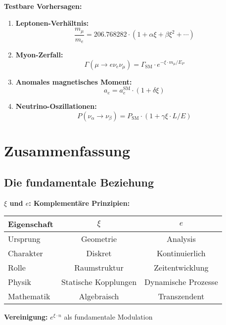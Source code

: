 \documentclass[12pt,a4paper]{article}
\begin{document}
	\begin{anwendung}
		\textbf{Testbare Vorhersagen:}
		
		\begin{enumerate}
			\item \textbf{Leptonen-Verhältnis:}
			\begin{equation}
				\frac{m_\mu}{m_e} = 206.768282 \cdot (1 + \alpha \xi + \beta \xi^2 + \cdots)
			\end{equation}
			
			\item \textbf{Myon-Zerfall:}
			\begin{equation}
				\Gamma(\mu \to e\nu_e\nu_\mu) = \Gamma_{\text{SM}} \cdot e^{-\xi \cdot m_\mu/E_P}
			\end{equation}
			
			\item \textbf{Anomales magnetisches Moment:}
			\begin{equation}
				a_e = a_e^{\text{SM}} \cdot (1 + \delta \xi)
			\end{equation}
			
			\item \textbf{Neutrino-Oszillationen:}
			\begin{equation}
				P(\nu_\alpha \to \nu_\beta) = P_{\text{SM}} \cdot (1 + \gamma \xi \cdot L/E)
			\end{equation}
		\end{enumerate}
	\end{anwendung}
	
	\section{Zusammenfassung}
	
	\subsection{Die fundamentale Beziehung}
	
	\begin{erkenntnis}
		\textbf{$\xi$ und $e$: Komplementäre Prinzipien:}
		
		\begin{center}
			\begin{tabular}{lcc}
				\toprule
				\textbf{Eigenschaft} & \textbf{$\xi$} & \textbf{$e$} \\
				\midrule
				Ursprung & Geometrie & Analysis \\
				Charakter & Diskret & Kontinuierlich \\
				Rolle & Raumstruktur & Zeitentwicklung \\
				Physik & Statische Kopplungen & Dynamische Prozesse \\
				Mathematik & Algebraisch & Transzendent \\
				\bottomrule
			\end{tabular}
		\end{center}
		
		\textbf{Vereinigung:} $e^{\xi \cdot n}$ als fundamentale Modulation
	\end{erkenntnis}
	
\end{document}
